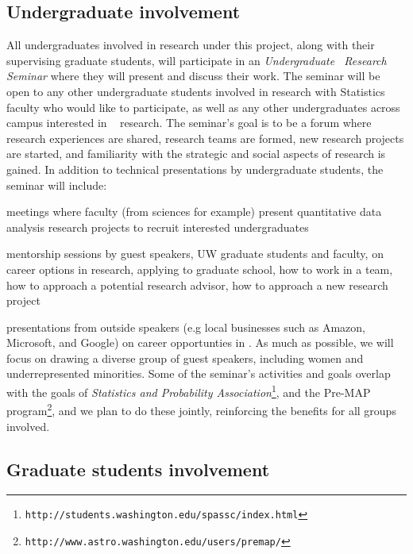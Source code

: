 \subsection{Undergraduate involvement}
\label{sec:ugradseminar}
All undergraduates involved in research under this project, along with
their supervising graduate students, will participate in an {\em
  Undergraduate \cdse\ Research Seminar} where they will present and
discuss their work.  The seminar will be open to any other
undergraduate students involved in research with Statistics faculty
who would like to participate, as well as any other undergraduates
across campus interested in \cdse~ research. The seminar's goal is to
be a forum where research experiences are shared, research teams are
formed, new research projects are started, and familiarity with the
strategic and social aspects of research is gained.
In addition to technical presentations by undergraduate
students, the seminar will include:
\bits
\item meetings where faculty (from sciences for example) present quantitative data analysis research projects to recruit interested undergraduates
\item  mentorship sessions by guest speakers, UW graduate students and faculty, on career options in research, applying to graduate school, how to work in a team, how to approach a potential research advisor, how to approach a new research project
\item presentations from outside speakers (e.g local businesses such as Amazon,
  Microsoft, and Google) on career opportunties in \cdse. As much as possible, we will focus on drawing a diverse group of guest speakers, including women and underrepresented minorities.
\eits
Some of the seminar's activities and goals overlap with the goals of {\em Statistics and Probability Association}\footnote{{\tt http://students.washington.edu/spassc/index.html}}, and the Pre-MAP program\footnote{\tt http://www.astro.washington.edu/users/premap/}, 
and we plan to do these jointly, reinforcing the  benefits for all groups involved.

\subsection{Graduate students involvement}
\label{sec:activities-grad}

